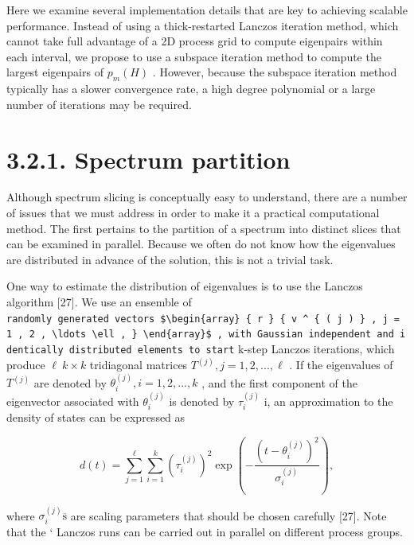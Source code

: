 \documentclass[
  10
]{article}
\begin{document}
Here we examine several implementation details that are key to achieving
scalable performance. Instead of using a thick-restarted Lanczos
iteration method, which cannot take full advantage of a 2D process grid
to compute eigenpairs within each interval, we propose to use a subspace
iteration method to compute the largest eigenpairs of
\(p _ { m } ( H )\) . However, because the subspace iteration method
typically has a slower convergence rate, a high degree polynomial or a
large number of iterations may be required.

\section{3.2.1. Spectrum partition}\label{spectrum-partition}

Although spectrum slicing is conceptually easy to understand, there are
a number of issues that we must address in order to make it a practical
computational method. The first pertains to the partition of a spectrum
into distinct slices that can be examined in parallel. Because we often
do not know how the eigenvalues are distributed in advance of the
solution, this is not a trivial task.

One way to estimate the distribution of eigenvalues is to use the
Lanczos algorithm {[}27{]}. We use an ensemble of
\texttt{randomly\ generated\ vectors\ \$\textbackslash{}begin\{array\}\ \{\ r\ \}\ \{\ v\ \^{}\ \{\ (\ j\ )\ \}\ ,\ j\ =\ 1\ ,\ 2\ ,\ \textbackslash{}ldots\ \textbackslash{}ell\ ,\ \}\ \textbackslash{}end\{array\}\$\ ,\ with\ Gaussian\ independent\ and\ identically\ distributed\ elements\ to\ start}
k-step Lanczos iterations, which produce \(\ell \ k \times k\)
tridiagonal matrices \(T ^ { ( j ) } , j = 1 , 2 , . . . , \ell\) . If
the eigenvalues of \(T ^ { ( j ) }\) are denoted by
\(\theta _ { i } ^ { ( j ) } , i = 1 , 2 , . . . , k\) , and the first
component of the eigenvector associated with
\(\theta _ { i } ^ { ( j ) }\) is denoted by
\(\tau _ { i } ^ { ( j ) }\) i, an approximation to the density of
states can be expressed as

\[
d (t) = \sum_ {j = 1} ^ {\ell} \sum_ {i = 1} ^ {k} (\tau_ {i} ^ {(j)}) ^ {2} \exp \left(- \frac {(t - \theta_ {i} ^ {(j)}) ^ {2}}{\sigma_ {i} ^ {(j)}}\right), \tag {5}
\]

where
\(\sigma _ { i } ^ { \left( j \right) } \mathrm { \overline { { s } } }\)
are scaling parameters that should be chosen carefully {[}27{]}. Note
that the ` Lanczos runs can be carried out in parallel on different
process groups.
\end{document}
